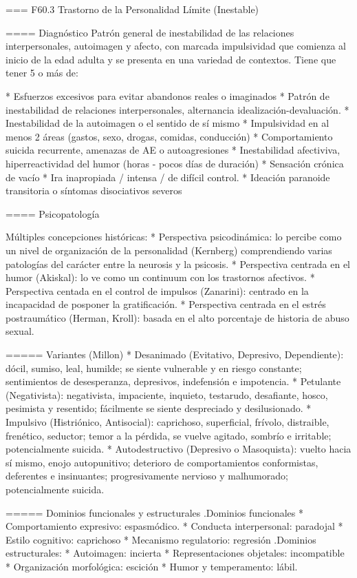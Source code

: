 === F60.3 Trastorno de la Personalidad Límite (Inestable)

==== Diagnóstico
Patrón general de inestabilidad de las relaciones interpersonales, autoimagen y afecto, con marcada impulsividad que comienza al inicio de la edad adulta y se presenta en una variedad de contextos. Tiene que tener 5 o más de:

* Esfuerzos excesivos para evitar abandonos reales o imaginados
* Patrón de inestabilidad de relaciones interpersonales, alternancia idealización-devaluación.
* Inestabilidad de la autoimagen o el sentido de sí mismo
* Impulsividad en al menos 2 áreas (gastos, sexo, drogas, comidas, conducción)
* Comportamiento suicida recurrente, amenazas de AE o autoagresiones
* Inestabilidad afectiviva, hiperreactividad del humor (horas - pocos días de duración)
* Sensación crónica de vacío
* Ira inapropiada / intensa / de difícil control.
* Ideación paranoide transitoria o síntomas disociativos severos

==== Psicopatología

Múltiples concepciones históricas:
* Perspectiva psicodinámica: lo percibe como un nivel de organización de la personalidad (Kernberg) comprendiendo varias patologías del carácter entre la neurosis y la psicosis.
* Perspectiva centrada en el humor (Akiskal): lo ve como un continuum con los trastornos afectivos.
* Perspectiva centada en el control de impulsos (Zanarini): centrado en la incapacidad de posponer la gratificación.
* Perspectiva centrada en el estrés postraumático (Herman, Kroll): basada en el alto porcentaje de historia de abuso sexual.

===== Variantes (Millon)
* Desanimado (Evitativo, Depresivo, Dependiente): dócil, sumiso, leal, humilde; se siente vulnerable y en riesgo constante; sentimientos de desesperanza, depresivos, indefensión e impotencia.
* Petulante (Negativista): negativista, impaciente, inquieto, testarudo, desafiante, hosco, pesimista y resentido; fácilmente se siente despreciado y desilusionado.
* Impulsivo (Histriónico, Antisocial): caprichoso, superficial, frívolo, distraible, frenético, seductor; temor a la pérdida, se vuelve agitado, sombrío e irritable; potencialmente suicida.
* Autodestructivo (Depresivo o Masoquista): vuelto hacia sí mismo, enojo autopunitivo; deterioro de comportamientos conformistas, deferentes e insinuantes; progresivamente nervioso y malhumorado; potencialmente suicida. 

===== Dominios funcionales y estructurales
.Dominios funcionales
* Comportamiento expresivo: espasmódico.
* Conducta interpersonal: paradojal
* Estilo cognitivo: caprichoso
* Mecanismo regulatorio: regresión
.Dominios estructurales:
* Autoimagen: incierta
* Representaciones objetales: incompatible
* Organización morfológica: escición
* Humor y temperamento: lábil.